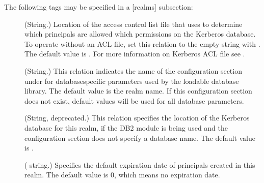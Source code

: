 \documentclass[letterpaper,10pt,english]{sphinxmanual}
\begin{document}
\sphinxAtStartPar
The following tags may be specified in a {[}realms{]} subsection:
\begin{description}
\item[{}] \leavevmode
\sphinxAtStartPar
(String.)  Location of the access control list file that
{\hyperref[\detokenize{admin/admin_commands/kadmind:kadmind-8}]{}} uses to determine which principals are allowed
which permissions on the Kerberos database.  To operate without an
ACL file, set this relation to the empty string with .  The default value is {\hyperref[\detokenize{mitK5defaults:paths}]{}}.  For more
information on Kerberos ACL file see {\hyperref[\detokenize{admin/conf_files/kadm5_acl:kadm5-acl-5}]{}}.

\item[{}] \leavevmode
\sphinxAtStartPar
(String.)  This relation indicates the name of the configuration
section under {\hyperref[\detokenize{admin/conf_files/kdc_conf:dbmodules}]{}} for database\sphinxhyphen{}specific parameters
used by the loadable database library.  The default value is the
realm name.  If this configuration section does not exist, default
values will be used for all database parameters.

\item[{}] \leavevmode
\sphinxAtStartPar
(String, deprecated.)  This relation specifies the location of the
Kerberos database for this realm, if the DB2 module is being used
and the {\hyperref[\detokenize{admin/conf_files/kdc_conf:dbmodules}]{}} configuration section does not specify a
database name.  The default value is {\hyperref[\detokenize{mitK5defaults:paths}]{}}.

\item[{}] \leavevmode
\sphinxAtStartPar
( string.)  Specifies the default expiration date of
principals created in this realm.  The default value is 0, which
means no expiration date.


\end{description}
\end{document}
